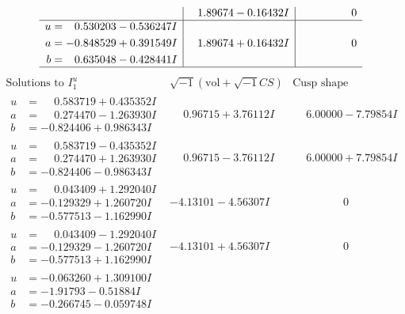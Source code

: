 \documentclass[1p]{elsarticle_modified}
\theoremstyle{definition}
\newcommand{\I}{\sqrt{-1}}
\begin{document}
$$\begin{array}{c|c|c}
 & \phantom{-}1.89674 - 0.16432 I & \phantom{-0.000000 } 0 \\ \hline\begin{aligned}
u &= \phantom{-}0.530203 - 0.536247 I \\
a &= -0.848529 + 0.391549 I \\
b &= \phantom{-}0.635048 - 0.428441 I\end{aligned}
 & \phantom{-}1.89674 + 0.16432 I & \phantom{-0.000000 } 0\\
 \hline 
 \end{array}$$\newpage$$\begin{array}{c|c|c}  
\text{Solutions to }I^u_{1}& \I (\text{vol} + \sqrt{-1}CS) & \text{Cusp shape}\\
 \hline 
\begin{aligned}
u &= \phantom{-}0.583719 + 0.435352 I \\
a &= \phantom{-}0.274470 - 1.263930 I \\
b &= -0.824406 + 0.986343 I\end{aligned}
 & \phantom{-}0.96715 + 3.76112 I & \phantom{-}6.00000 - 7.79854 I \\ \hline\begin{aligned}
u &= \phantom{-}0.583719 - 0.435352 I \\
a &= \phantom{-}0.274470 + 1.263930 I \\
b &= -0.824406 - 0.986343 I\end{aligned}
 & \phantom{-}0.96715 - 3.76112 I & \phantom{-}6.00000 + 7.79854 I \\ \hline\begin{aligned}
u &= \phantom{-}0.043409 + 1.292040 I \\
a &= -0.129329 + 1.260720 I \\
b &= -0.577513 - 1.162990 I\end{aligned}
 & -4.13101 - 4.56307 I & \phantom{-0.000000 } 0 \\ \hline\begin{aligned}
u &= \phantom{-}0.043409 - 1.292040 I \\
a &= -0.129329 - 1.260720 I \\
b &= -0.577513 + 1.162990 I\end{aligned}
 & -4.13101 + 4.56307 I & \phantom{-0.000000 } 0 \\ \hline\begin{aligned}
u &= -0.063260 + 1.309100 I \\
a &= -1.91793 - 0.51884 I \\
b &= -0.266745 - 0.059748 I\end{aligned}

\end{array}$$
\end{document}
